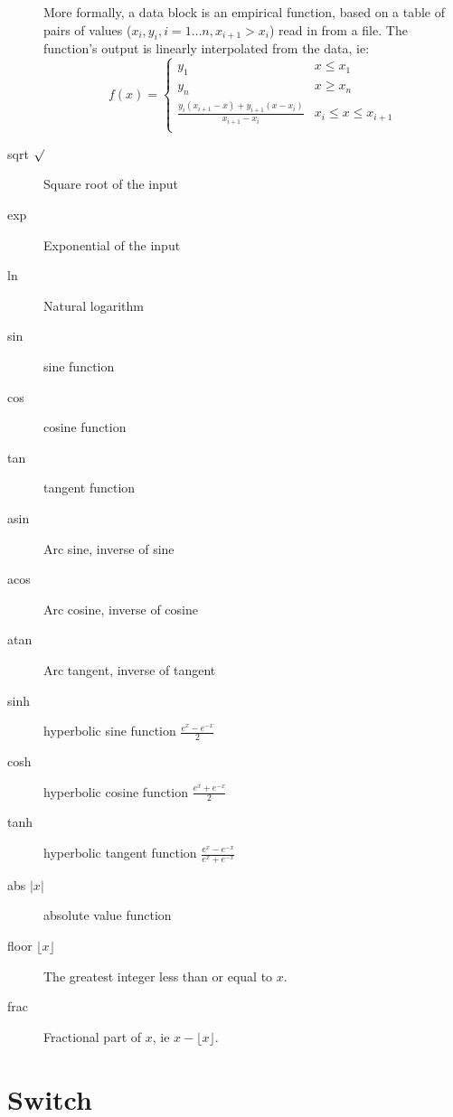 \begin{description}
More formally, a data block is an empirical function, based on a table
of pairs of values ($x_i, y_i, i=1\ldots n, x_{i+1}>x_i$) read in from
a file. The function's output is linearly interpolated from the data,
ie:
\begin{displaymath}
f(x) = \left\{
\begin{array}{cl}
y_1 & x\leq x_1\\
y_n & x\geq x_n\\
\frac{y_i(x_{i+1}-x)+y_{i+1}(x-x_i)}{x_{i+1}-x_i} & x_i \leq x \leq
x_{i+1}\\
\end{array}
\right.
\end{displaymath}

\item[sqrt $\surd$]\label{op:sqrt} Square root of the input

\item[exp]\label{op:exp} Exponential of the input

\item[ln]\label{op:ln} Natural logarithm

\item[sin]\label{op:sin} sine function
\item[cos]\label{op:cos} cosine function
\item[tan]\label{op:tan} tangent function
\item[asin]\label{op:asin} Arc sine, inverse of sine
\item[acos]\label{op:acos} Arc cosine, inverse of cosine
\item[atan]\label{op:atan} Arc tangent, inverse of tangent
\item[sinh]\label{op:sinh} hyperbolic sine function $\frac{e^x-e^{-x}}2$
\item[cosh]\label{op:cosh} hyperbolic cosine function $\frac{e^x+e^{-x}}2$
\item[tanh]\label{op:tanh} hyperbolic tangent function $\frac{e^x-e^{-x}}{e^x+e^{-x}}$
\item[abs $|x|$]\label{op:abs} absolute value function
\item[floor $\lfloor x\rfloor$]\label{op:floor} The greatest integer
  less than or equal to $x$.
\item[frac]\label{op:frac} Fractional part of $x$, ie $x-\lfloor x\rfloor$. 

\end{description}

\section{Switch}\label{switch}

